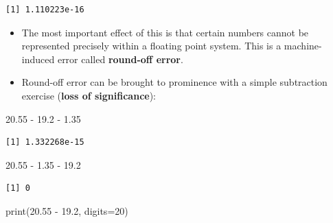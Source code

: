\documentclass[
  9pt,
  a4paper,
  ignorenonframetext,
  notheorems]{beamer}
\newenvironment{Shaded}{\begin{snugshade}}{\end{snugshade}}
\newcommand{\AttributeTok}[1]{\textcolor[rgb]{0.40,0.45,0.13}{#1}}
\newcommand{\DecValTok}[1]{\textcolor[rgb]{0.68,0.00,0.00}{#1}}
\newcommand{\FloatTok}[1]{\textcolor[rgb]{0.68,0.00,0.00}{#1}}
\newcommand{\FunctionTok}[1]{\textcolor[rgb]{0.28,0.35,0.67}{#1}}
\newcommand{\NormalTok}[1]{\textcolor[rgb]{0.00,0.23,0.31}{#1}}
\newcommand{\SpecialCharTok}[1]{\textcolor[rgb]{0.37,0.37,0.37}{#1}}
\providecommand{\tightlist}{%
  \setlength{\itemsep}{0pt}\setlength{\parskip}{0pt}}\usepackage{longtable,booktabs,array}
\begin{document}
\begin{frame}[fragile]
\begin{Shaded}
\end{Shaded}

\begin{verbatim}
[1] 1.110223e-16
\end{verbatim}
\end{frame}

\begin{frame}[fragile]
\begin{itemize}
\tightlist
\item
  The most important effect of this is that certain numbers cannot be
  represented precisely within a floating point system. This is a
  machine-induced error called \textbf{round-off error}.
\end{itemize}

\begin{itemize}
\tightlist
\item
  Round-off error can be brought to prominence with a simple subtraction
  exercise (\textbf{loss of significance}):
\end{itemize}

\begin{Shaded}
\begin{Highlighting}[]
\FloatTok{20.55} \SpecialCharTok{{-}} \FloatTok{19.2} \SpecialCharTok{{-}} \FloatTok{1.35}
\end{Highlighting}
\end{Shaded}

\begin{verbatim}
[1] 1.332268e-15
\end{verbatim}

\begin{Shaded}
\begin{Highlighting}[]
\FloatTok{20.55} \SpecialCharTok{{-}} \FloatTok{1.35} \SpecialCharTok{{-}} \FloatTok{19.2}
\end{Highlighting}
\end{Shaded}

\begin{verbatim}
[1] 0
\end{verbatim}

\begin{Shaded}
\begin{Highlighting}[]
\FunctionTok{print}\NormalTok{(}\FloatTok{20.55} \SpecialCharTok{{-}} \FloatTok{19.2}\NormalTok{, }\AttributeTok{digits=}\DecValTok{20}\NormalTok{)}
\end{Highlighting}
\end{Shaded}


\end{frame}
\end{document}
